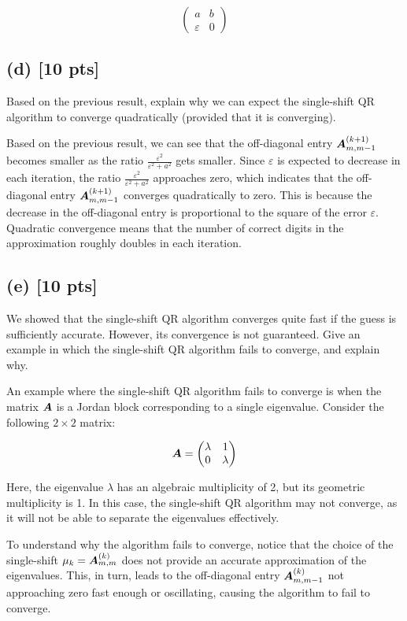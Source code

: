\documentclass[twoside,10pt]{article}
\begin{document}
$$\begin{pmatrix}
  a & b \\
  \varepsilon & 0
\end{pmatrix}$$

  \subsection*{(d) [10 pts]} 
  Based on the previous result, explain why we can expect the single-shift QR algorithm to converge quadratically (provided that it is converging). 

  \quad Based on the previous result, we can see that the off-diagonal entry $\bm{A}_{m, m-1}^{(k + 1)}$ becomes smaller as the ratio $\frac{\varepsilon^2}{\varepsilon^2 + a^2}$ gets smaller. Since $\varepsilon$ is expected to decrease in each iteration, the ratio $\frac{\varepsilon^2}{\varepsilon^2 + a^2}$ approaches zero, which indicates that the off-diagonal entry $\bm{A}_{m, m-1}^{(k + 1)}$ converges quadratically to zero. This is because the decrease in the off-diagonal entry is proportional to the square of the error $\varepsilon$. Quadratic convergence means that the number of correct digits in the approximation roughly doubles in each iteration.

  \subsection*{(e) [10 pts]}
  We showed that the single-shift QR algorithm converges quite fast if the guess is sufficiently accurate. 
  However, its convergence is not guaranteed.
  Give an example in which the single-shift QR algorithm fails to converge, and explain why.


\quad An example where the single-shift QR algorithm fails to converge is when the matrix $\bm{A}$ is a Jordan block corresponding to a single eigenvalue. Consider the following $2 \times 2$ matrix:

$$\bm{A} = \begin{pmatrix}
  \lambda & 1 \\
  0 & \lambda
\end{pmatrix}$$

Here, the eigenvalue $\lambda$ has an algebraic multiplicity of 2, but its geometric multiplicity is 1. In this case, the single-shift QR algorithm may not converge, as it will not be able to separate the eigenvalues effectively.

To understand why the algorithm fails to converge, notice that the choice of the single-shift $\mu_k = \bm{A}_{m, m}^{(k)}$ does not provide an accurate approximation of the eigenvalues. This, in turn, leads to the off-diagonal entry $\bm{A}_{m, m-1}^{(k)}$ not approaching zero fast enough or oscillating, causing the algorithm to fail to converge.
\end{document}
